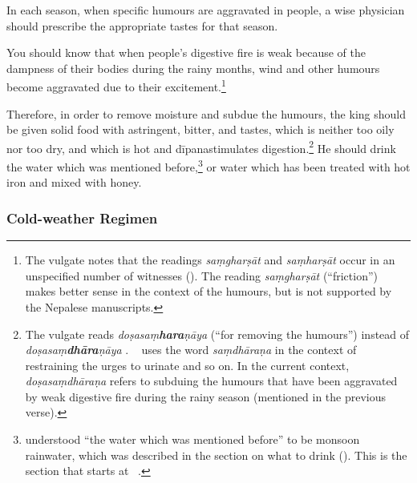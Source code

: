 \begin{translation}
\item [4] 
In each season, when specific humours are aggravated in people, a wise physician should prescribe the appropriate tastes for that season.

\item [5] %
You should know that when people's digestive fire is weak because of the dampness of their bodies during the rainy months, wind and other humours become aggravated due to their excitement.\footnote{%
    The vulgate notes that the readings \emph{saṃgharṣāt} and \emph{saṃharṣāt} occur in an unspecified number of witnesses (\cite[809, n.\,2]{vulgate}). The reading \emph{saṃgharṣāt} (``friction'') makes better sense in the context of the humours, but is not supported by the Nepalese manuscripts.}

\item [6--8ab] 
Therefore, in order to remove moisture and subdue the humours,
the king should be given solid food with astringent, bitter, and  tastes, which is neither too oily nor too dry, and which is hot and \se
{dīpana}{stimulates digestion}.\footnote{%
        The vulgate reads \emph{doṣasaṃ\textbf{hara}ṇāya} (``for removing the humours'') instead of \emph{doṣasaṃ\textbf{dhāra}ṇāya} \citep[809]{vulgate}. \CS\  uses the word \emph{saṃdhāraṇa} in the context of restraining the urges to urinate and so on. In the current context, \emph{doṣasaṃdhāraṇa} refers to subduing the humours that have been aggravated by weak digestive fire during the rainy season (mentioned in the previous verse).}  
He should drink the water which was mentioned before,\footnote{%
         understood “the water which was mentioned before” to be monsoon rainwater, which was described in the section on what to drink (). This is the section that starts at \SS\ .} %
or water which has been treated with hot iron %
and mixed with honey.%
%

% 

\subsubsection{Cold-weather Regimen} %


\end{translation}
